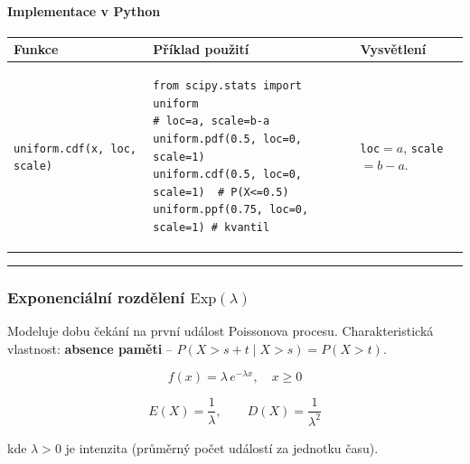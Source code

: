 \documentclass[a4paper, 11pt]{article}
\newenvironment{funkcedict}
{%
  \begingroup
  \renewcommand{\arraystretch}{1.4}%
  \lstset{basicstyle=\ttfamily\small, columns=fullflexible}%
  \setlength{\tabcolsep}{4pt}%
  \begin{tabular}{p{0.19\textwidth} p{0.38\textwidth} p{0.30\textwidth}}
  \textbf{Funkce} & \textbf{Příklad použití} & \textbf{Vysvětlení} \\
  \midrule
}
{%
  \end{tabular}%
  \endgroup
}
\begin{document}
\paragraph{Implementace v Python}\mbox{}\par

\begin{funkcedict}
	\texttt{uniform.cdf(x, loc, scale)} &
	\begin{lstlisting}
from scipy.stats import uniform
# loc=a, scale=b-a
uniform.pdf(0.5, loc=0, scale=1)
uniform.cdf(0.5, loc=0, scale=1)  # P(X<=0.5)
uniform.ppf(0.75, loc=0, scale=1) # kvantil
	\end{lstlisting}
	& \texttt{loc}$=a$, \texttt{scale}$=b-a$. \\
\end{funkcedict}

\noindent\hrule\medskip

\subsubsection{Exponenciální rozdělení $\mathrm{Exp}(\lambda)$}

Modeluje dobu čekání na první událost Poissonova procesu.
Charakteristická vlastnost: \textbf{absence paměti} --
$P(X > s+t \mid X > s) = P(X > t)$.

\begin{equation*}
	f(x) = \lambda\, e^{-\lambda x}, \quad x \ge 0
\end{equation*}

\begin{equation*}
	E(X) = \frac{1}{\lambda}, \qquad D(X) = \frac{1}{\lambda^2}
\end{equation*}

kde $\lambda > 0$ je intenzita (průměrný počet událostí za jednotku času).

\begin{center}
\end{center}
\end{document}
